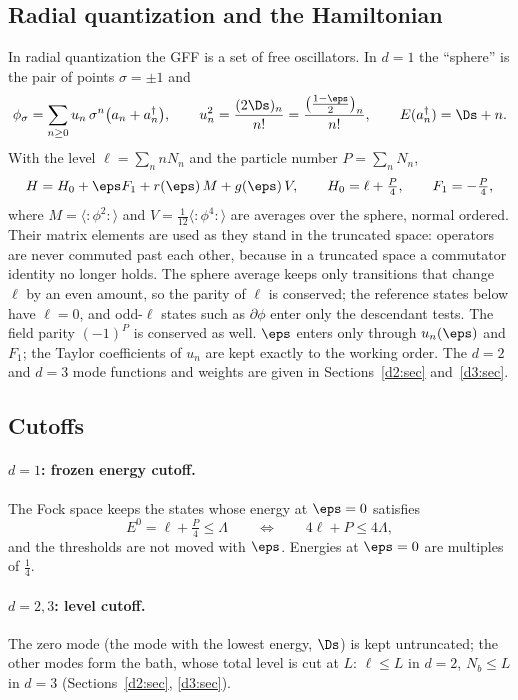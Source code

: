 \subsection{Radial quantization and the Hamiltonian}
In radial quantization the GFF is a set of free oscillators. In $d=1$ the ``sphere'' is the pair of points
$\sigma=\pm1$ and
\begin{equation}
 \phi_\sigma=\sum_{n\ge0}u_n\,\sigma^n\big(a_n+a_n^\dagger\big),\qquad
 u_n^2=\frac{(2\Ds)_n}{n!}=\frac{\big(\tfrac{1-\eps}2\big)_n}{n!},\qquad E(a_n^\dagger)=\Ds+n .
 \label{eq:modes}
\end{equation}
With the level $\ell=\sum_n nN_n$ and the particle number $P=\sum_nN_n$,
\begin{equation}
 H=H_0+\eps F_1+r(\eps)\,M+g(\eps)\,V,\qquad H_0=\ell+\tfrac P4,\qquad F_1=-\tfrac P4,
 \label{eq:H}
\end{equation}
where $M=\langle{:}\phi^2{:}\rangle$ and $V=\tfrac1{12}\langle{:}\phi^4{:}\rangle$ are averages over the sphere, normal
ordered. Their matrix elements are used as they stand in the truncated space: operators are never commuted past each
other, because in a truncated space a commutator identity no longer holds. The sphere average keeps only transitions
that change $\ell$ by an even amount, so the parity of $\ell$ is conserved; the reference states below have $\ell=0$, and
odd-$\ell$ states such as $\partial\phi$ enter only the descendant tests. The field parity $(-1)^P$ is conserved as
well. $\eps$ enters only through $u_n(\eps)$ and $F_1$; the Taylor coefficients of $u_n$ are kept exactly to the working
order. The $d=2$ and $d=3$ mode functions and weights are given in Sections~\ref{d2:sec} and~\ref{d3:sec}.

\subsection{Cutoffs}
\paragraph{$d=1$: frozen energy cutoff.} The Fock space keeps the states whose energy at $\eps=0$ satisfies
\begin{equation}
 E^0=\ell+\tfrac P4\le\Lambda\qquad\Longleftrightarrow\qquad 4\ell+P\le4\Lambda ,
 \label{eq:Lambda}
\end{equation}
and the thresholds are not moved with $\eps$. Energies at $\eps=0$ are multiples of $\tfrac14$.

\paragraph{$d=2,3$: level cutoff.} The zero mode (the mode with the lowest energy, $\Ds$) is kept untruncated; the
other modes form the bath, whose total level is cut at $L$: $\ell\le L$ in $d=2$, $N_b\le L$ in $d=3$
(Sections~\ref{d2:sec}, \ref{d3:sec}).

